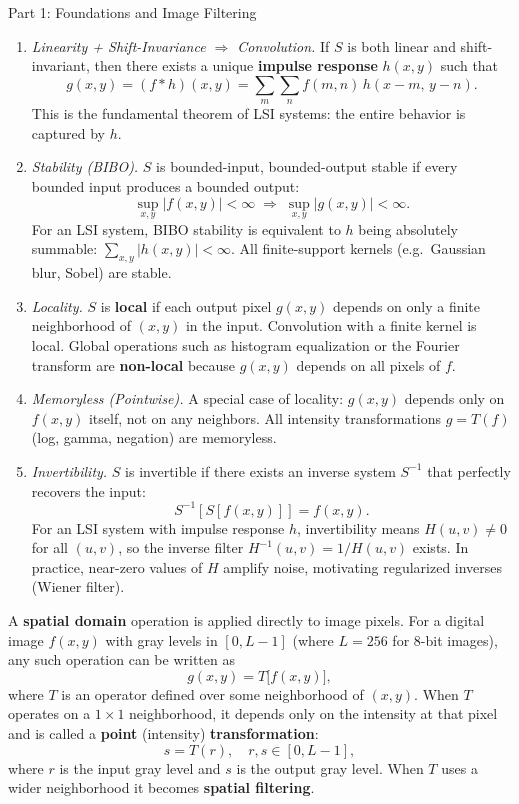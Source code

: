 \documentclass[letterpaper]{article}
\begin{document}
\begin{notes}{Part 1: Foundations and Image Filtering}
\begin{enumerate}
    \item \textit{Linearity + Shift-Invariance $\Rightarrow$ Convolution.} If $S$ is both linear and shift-invariant, then there exists a unique \textbf{impulse response} $h(x,y)$ such that
    $$g(x,y) = (f * h)(x,y) = \sum_m\sum_n f(m,n)\,h(x-m,\,y-n).$$
    This is the fundamental theorem of LSI systems: the entire behavior is captured by $h$.

    \item \textit{Stability (BIBO).} $S$ is bounded-input, bounded-output stable if every bounded input produces a bounded output:
    $$\sup_{x,y}|f(x,y)| < \infty \;\Rightarrow\; \sup_{x,y}|g(x,y)| < \infty.$$
    For an LSI system, BIBO stability is equivalent to $h$ being absolutely summable: $\sum_{x,y}|h(x,y)| < \infty$. All finite-support kernels (e.g.\ Gaussian blur, Sobel) are stable.

    \item \textit{Locality.} $S$ is \textbf{local} if each output pixel $g(x,y)$ depends on only a finite neighborhood of $(x,y)$ in the input. Convolution with a finite kernel is local. Global operations such as histogram equalization or the Fourier transform are \textbf{non-local} because $g(x,y)$ depends on all pixels of $f$.

    \item \textit{Memoryless (Pointwise).} A special case of locality: $g(x,y)$ depends only on $f(x,y)$ itself, not on any neighbors. All intensity transformations $g = T(f)$ (log, gamma, negation) are memoryless.

    \item \textit{Invertibility.} $S$ is invertible if there exists an inverse system $S^{-1}$ that perfectly recovers the input:
    $$S^{-1}[S[f(x,y)]] = f(x,y).$$
    For an LSI system with impulse response $h$, invertibility means $H(u,v) \neq 0$ for all $(u,v)$, so the inverse filter $H^{-1}(u,v)=1/H(u,v)$ exists. In practice, near-zero values of $H$ amplify noise, motivating regularized inverses (Wiener filter).
\end{enumerate}






A \textbf{spatial domain} operation is applied directly to image pixels. For a digital image $f(x,y)$ with gray levels in $[0, L-1]$ (where $L=256$ for 8-bit images), any such operation can be written as
$$
g(x,y) = T\bigl[f(x,y)\bigr],
$$
where $T$ is an operator defined over some neighborhood of $(x,y)$. When $T$ operates on a $1\times 1$ neighborhood, it depends only on the intensity at that pixel and is called a \textbf{point} (intensity) \textbf{transformation}:
$$
s = T(r),\quad r,s\in[0,L-1],
$$
where $r$ is the input gray level and $s$ is the output gray level. When $T$ uses a wider neighborhood it becomes \textbf{spatial filtering}.


\end{notes}
\end{document}
